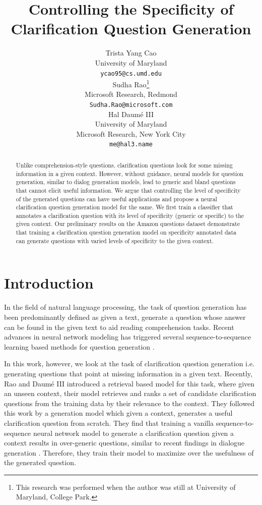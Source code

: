 \documentclass[11pt]{article}
\title{Controlling the Specificity of Clarification Question Generation}
\author{Trista Yang Cao \\
University of Maryland \\
{\tt ycao95@cs.umd.edu} \\ \And
Sudha Rao\thanks{This research was performed when the author was still at University of Maryland, College Park.} \\
Microsoft Research, Redmond \\
{\tt Sudha.Rao@microsoft.com} \\ \And
Hal Daum\'e III \\
University of Maryland \\
Microsoft Research, New York City\\
{\tt me@hal3.name} }
\date{}
\begin{document}
\maketitle
\begin{abstract}
Unlike comprehension-style questions, clarification questions look for some missing information in a given context. 
However, without guidance, neural models for question generation, similar to dialog generation models, lead to generic and bland questions that cannot elicit useful information. 
We argue that controlling the level of specificity of the generated questions can have useful applications and propose a neural clarification question generation model for the same. 
We first train a classifier that annotates a clarification question with its level of  specificity (generic or specific) to the given context.  
Our preliminary results on the Amazon questions dataset demonstrate that training a  clarification question generation model on specificity annotated data can generate questions with varied levels of specificity to the given context. 


\end{abstract}


\section{Introduction}
\label{intro}
In the field of natural language processing, the task of question generation has been predominantly defined as given a text, generate a question whose answer can be found in the given text \cite{heilman2011automatic,rus2010first,rus2011question} to aid reading comprehension tasks. Recent advances in neural network modeling has triggered several sequence-to-sequence learning \cite{sutskever2014sequence} based methods for question generation \cite{serban2016generating,duan2017question,du2017learning}.

In this work, however, we look at the task of clarification question generation i.e. generating questions that point at missing information in a given text. Recently, Rao and Daum\'e III \cite{rao2018learning} introduced a retrieval based model for this task, where given an unseen context, their model retrieves and ranks a set of candidate clarification questions from the training data by their relevance to the context. They followed this work by a generation model \cite{rao2019answer} which given a context, generates a useful clarification question from scratch. They find that training a vanilla sequence-to-sequence neural network model to generate a clarification question given a context results in over-generic questions, similar to recent findings in dialogue generation \cite{li2016deep}. Therefore, they train their model to maximize over the usefulness of the generated question.
\end{document}
